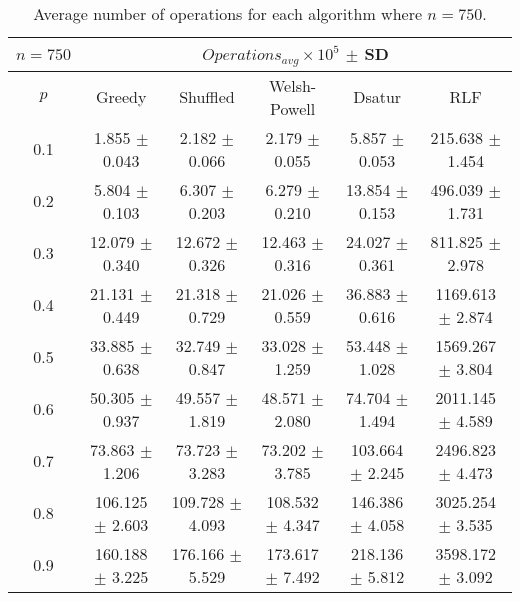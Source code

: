 \begin{table}[H]
    \centering
    \begin{tabular}{cccccc}
        
        $n = 750$& \multicolumn{5}{c}{$Operations_{avg}\times10^5$ $\pm$ SD} \\
        \hline
        $p$ & Greedy & Shuffled & Welsh-Powell & Dsatur & RLF \\
        \hline
        0.1 & 1.855 $\pm$ 0.043 & 2.182 $\pm$ 0.066 & 2.179 $\pm$ 0.055 & 5.857 $\pm$ 0.053 & 215.638 $\pm$ 1.454 \\
        0.2 & 5.804 $\pm$ 0.103 & 6.307 $\pm$ 0.203 & 6.279 $\pm$ 0.210 & 13.854 $\pm$ 0.153 & 496.039 $\pm$ 1.731 \\
        0.3 & 12.079 $\pm$ 0.340 & 12.672 $\pm$ 0.326 & 12.463 $\pm$ 0.316 & 24.027 $\pm$ 0.361 & 811.825 $\pm$ 2.978 \\
        0.4 & 21.131 $\pm$ 0.449 & 21.318 $\pm$ 0.729 & 21.026 $\pm$ 0.559 & 36.883 $\pm$ 0.616 & 1169.613 $\pm$ 2.874 \\
        0.5 & 33.885 $\pm$ 0.638 & 32.749 $\pm$ 0.847 & 33.028 $\pm$ 1.259 & 53.448 $\pm$ 1.028 & 1569.267 $\pm$ 3.804 \\
        0.6 & 50.305 $\pm$ 0.937 & 49.557 $\pm$ 1.819 & 48.571 $\pm$ 2.080 & 74.704 $\pm$ 1.494 & 2011.145 $\pm$ 4.589 \\
        0.7 & 73.863 $\pm$ 1.206 & 73.723 $\pm$ 3.283 & 73.202 $\pm$ 3.785 & 103.664 $\pm$ 2.245 & 2496.823 $\pm$ 4.473 \\
        0.8 & 106.125 $\pm$ 2.603 & 109.728 $\pm$ 4.093 & 108.532 $\pm$ 4.347 & 146.386 $\pm$ 4.058 & 3025.254 $\pm$ 3.535 \\
        0.9 & 160.188 $\pm$ 3.225 & 176.166 $\pm$ 5.529 & 173.617 $\pm$ 7.492 & 218.136 $\pm$ 5.812 & 3598.172 $\pm$ 3.092 \\
        \hline
    \end{tabular}
    \caption{Average number of operations for each algorithm where $n = 750$.}
    \label{tab:avgOpsforV750}
\end{table}


